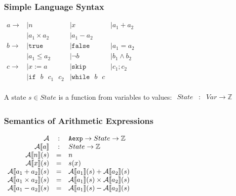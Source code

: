 \subsubsection{Simple Language Syntax}

\begin{math}
  \begin{array}{llll}
    a \to & \mid n & \mid x & \mid a_1 + a_2 \\
          & \mid a_1 \times a_2 & \mid a_1 - a_2 \\
    b \to & \mid \mathtt{true} & \mid \mathtt{false} & \mid a_1 = a_2  \\
          & \mid a_1 \leq a_2 & \mid \neg b & \mid b_1 \land b_2 \\
    c \to & \mid x := a  & \mid \mathtt{skip} & \mid c_1 ; c_2 \\
          & \mid \mathtt{if} \text{ }b \text{ }c_1\text{ }c_2 & \mid \mathtt{while} \text{ }b \text{ }c \\
  \end{array}
\end{math}

A state $ s \in State $ is a function from variables to values:
\begin{math}
  \begin{array}{rcl}
    State & : & Var \to \mathbb{Z} \\
  \end{array}
\end{math}


\subsubsection{Semantics of Arithmetic Expressions}

\begin{math}
  \begin{array}{rcl}
    \mathcal{A} & : & \mathtt{Aexp} \to State \to \mathbb{Z} \\
    \mathcal{A} \llbracket  a  \rrbracket & : & State \to \mathbb{Z} \\
    \mathcal{A} \llbracket  n  \rrbracket (s) & = & n \\
    \mathcal{A} \llbracket  x  \rrbracket (s) & = & s(x) \\
    \mathcal{A} \llbracket  a_1 + a_2  \rrbracket (s) & = & \mathcal{A} \llbracket  a_1  \rrbracket (s) + \mathcal{A} \llbracket  a_2  \rrbracket (s) \\
    \mathcal{A} \llbracket  a_1 \times a_2  \rrbracket (s) & = & \mathcal{A} \llbracket  a_1  \rrbracket (s) \times \mathcal{A} \llbracket  a_2  \rrbracket (s) \\
    \mathcal{A} \llbracket  a_1 - a_2  \rrbracket (s) & = & \mathcal{A} \llbracket  a_1  \rrbracket (s) - \mathcal{A} \llbracket  a_2  \rrbracket (s) \\
  \end{array}
\end{math}

